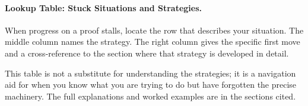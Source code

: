 \paragraph{Lookup Table: Stuck Situations and Strategies.}

\begin{remark}
When progress on a proof stalls, locate the row that describes your
situation. The middle column names the strategy. The right column
gives the specific first move and a cross-reference to the section
where that strategy is developed in detail.

This table is not a substitute for understanding the strategies; it
is a navigation aid for when you know what you are trying to do but
have forgotten the precise machinery. The full explanations and worked
examples are in the sections cited.
\end{remark}

